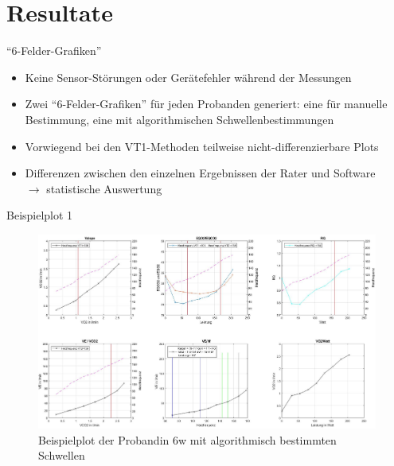 \documentclass[colorBG,slideColor,8pt]{beamer}
\begin{document}
\section{Resultate}

\begin{frame}{"`6-Felder-Grafiken"'}
	\begin{itemize}
		\item Keine Sensor-Störungen oder Gerätefehler während der Messungen
		\item Zwei "`6-Felder-Grafiken"' für jeden Probanden generiert: eine für manuelle Bestimmung, eine mit algorithmischen Schwellenbestimmungen
		\item Vorwiegend bei den VT1-Methoden teilweise nicht-differenzierbare Plots
		\item Differenzen zwischen den einzelnen Ergebnissen der Rater und Software\\$\rightarrow$ statistische Auswertung
	\end{itemize}
\end{frame}

\begin{frame}{Beispielplot 1}
	\begin{figure}[H]
		\centering
			\includegraphics[width=0.85\linewidth]{Bilder/auto_6.png}
			\caption{Beispielplot der Probandin 6w mit algorithmisch bestimmten Schwellen}
	\end{figure}
\end{frame}
\end{document}
